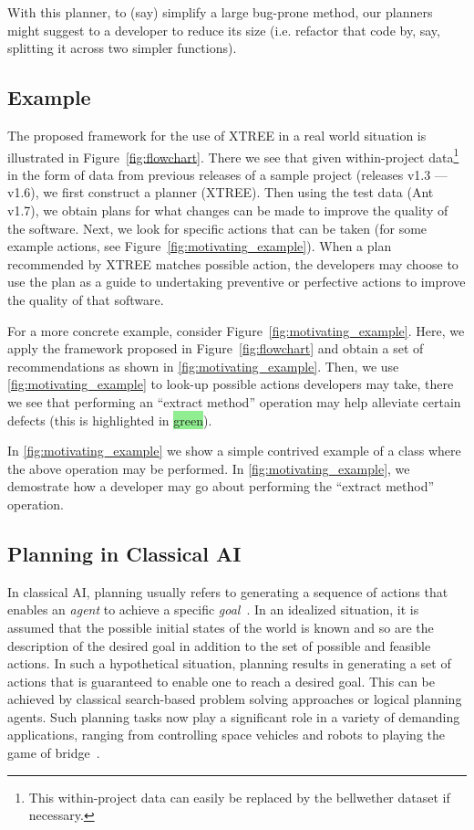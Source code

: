 \documentclass[10pt,journal,compsoc]{IEEEtran}
\newcommand{\fig}[1]{Figure~\ref{fig:#1}}
\begin{document}
With this planner, to (say) simplify a large bug-prone method, our planners
might suggest to a developer to reduce its size (i.e. refactor that
code by, say, splitting it across two simpler functions).

\subsection{Example}


The proposed framework for the use of XTREE in a real world situation is illustrated in \fig{flowchart}. There we see that given within-project data\footnote{This within-project data can easily be replaced by the bellwether dataset if necessary.} in the form of data from previous releases of a sample project (releases v1.3 --- v1.6), we first construct a planner (XTREE). Then using the test data (Ant v1.7), we obtain plans for what changes can be made to improve the quality of the software. Next, we look for specific actions that can be taken (for some example actions, see \fig{motivating_example}\protect{}). When a plan recommended by XTREE matches possible action, the developers may choose to use the plan as a guide to undertaking preventive or perfective  actions to improve the quality of that software.


For a more concrete example, consider \fig{motivating_example}. Here, we apply the framework proposed in \fig{flowchart} and obtain a set of recommendations as shown in \ref{fig:motivating_example}\protect{}. Then, we use \ref{fig:motivating_example}\protect{} to look-up possible actions developers may take, there we see that performing an ``extract method'' operation may help alleviate certain defects (this is highlighted in {\colorbox{lightgreen}{green}}). 

In \ref{fig:motivating_example}\protect{} we show a simple contrived example of a class where the above operation may be performed. In \ref{fig:motivating_example}\protect{}, we demostrate how a developer may go about performing the ``extract method'' operation.

\subsection{Planning in Classical AI}

In classical AI, planning usually refers to generating a sequence of actions that enables an \textit{agent} to achieve a specific \textit{goal}~\cite{norvig}. In an idealized situation, it is assumed that the possible initial states of the world is known and so are the description of the desired goal in addition to the set of possible and feasible actions. In such a hypothetical situation, planning results in generating a set of actions that is guaranteed to enable one to reach a desired goal. This can be achieved by classical search-based problem solving  approaches or logical planning agents. Such planning tasks now play a significant role in a variety of demanding applications, ranging from controlling space vehicles and robots to playing the game of bridge~\cite{ghallab04}. 
\end{document}
